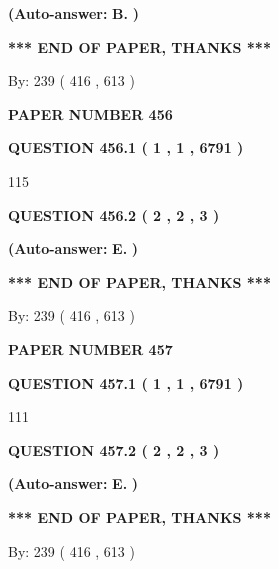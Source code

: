 \documentclass{ctexart}
\begin{document}
 
{\textbf{(Auto-answer:}}
{\textbf{\large{
B.}}}
{\textbf{)}}
 
 
   
   
   
   
\vspace{1.0in} 
{\textbf{\large{ *** END OF PAPER, THANKS *** }}} 
   
   
\hspace{1.0in} By: 
 239 ( 416 ,  613 )
   
   
   
   
\newpage 
\setcounter{page}{ 
   456001 } 
   
   
 {\textbf{ \Large{ PAPER NUMBER  456  }}}
   
   
   
   
  
  
{\textbf{\large{QUESTION
456.1 
 ( 1 , 1 , 6791 )
}}}

115
  
  
{\textbf{\large{QUESTION
456.2 
 ( 2 , 2 , 3 )
}}}
 
 
{\textbf{(Auto-answer:}}
{\textbf{\large{
E.}}}
{\textbf{)}}
 
 
   
   
   
   
\vspace{1.0in} 
{\textbf{\large{ *** END OF PAPER, THANKS *** }}} 
   
   
\hspace{1.0in} By: 
 239 ( 416 ,  613 )
   
   
   
   
\newpage 
\setcounter{page}{ 
   457001 } 
   
   
 {\textbf{ \Large{ PAPER NUMBER  457  }}}
   
   
   
   
  
  
{\textbf{\large{QUESTION
457.1 
 ( 1 , 1 , 6791 )
}}}

111
  
  
{\textbf{\large{QUESTION
457.2 
 ( 2 , 2 , 3 )
}}}
 
 
{\textbf{(Auto-answer:}}
{\textbf{\large{
E.}}}
{\textbf{)}}
 
 
   
   
   
   
\vspace{1.0in} 
{\textbf{\large{ *** END OF PAPER, THANKS *** }}} 
   
   
\hspace{1.0in} By: 
 239 ( 416 ,  613 )
   
   
   
\end{document}
